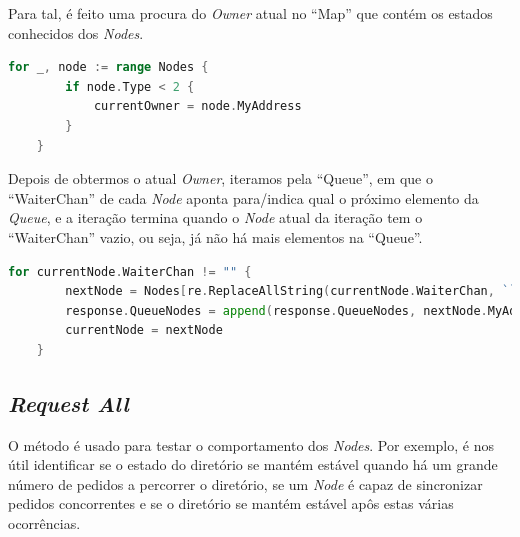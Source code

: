 Para tal, é feito uma procura do \emph{Owner} atual no ``Map'' que contém os estados conhecidos dos \emph{Nodes}.

\begin{lstlisting}[caption={Iteração pelo ``Map'' ``Nodes'', instanciação do objeto e adicionado à lista },language=Go]
	for _, node := range Nodes {
		if node.Type < 2 {
			currentOwner = node.MyAddress
		}
	}

\end{lstlisting}

Depois de obtermos o atual \emph{Owner}, iteramos pela ``Queue'', em que o ``WaiterChan'' de cada \emph{Node}
aponta para/indica qual o próximo elemento da \emph{Queue}, e a iteração termina quando o \emph{Node} atual da iteração tem o ``WaiterChan'' vazio, ou seja, já não há mais elementos na ``Queue''.

\begin{lstlisting}[caption={Iteração pelo ``Map'' ``Nodes'', instanciação do objeto e adicionado à lista },language=Go]
	for currentNode.WaiterChan != "" {
		nextNode = Nodes[re.ReplaceAllString(currentNode.WaiterChan, ``)]
		response.QueueNodes = append(response.QueueNodes, nextNode.MyAddress)
		currentNode = nextNode
	}

\end{lstlisting}

\subsection{\emph{Request All}}

O método é usado para testar o comportamento dos \emph{Nodes}.
Por exemplo, é nos útil identificar se o estado do diretório se mantém estável quando há um grande número de
pedidos a percorrer o diretório, se um \emph{Node} é capaz de sincronizar pedidos concorrentes e se o diretório se mantém estável apôs estas várias ocorrências.

